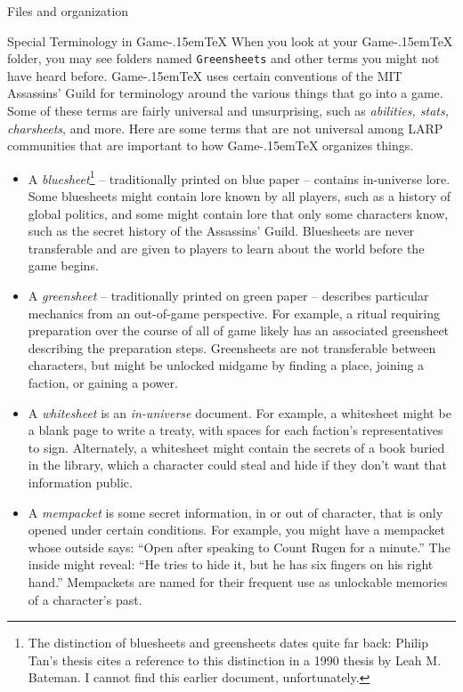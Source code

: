 \documentclass[11pt]{article}
\def\gametex{\mbox{Game\kern-.15em\TeX}}
\begin{document}
\begin{section}{Files and organization}
\begin{subsection}{Special Terminology in \gametex{}}
When you look at your \gametex{} folder, you may see folders named \texttt{Greensheets} and other terms you might not have heard before.  \gametex{} uses certain conventions of the MIT Assassins' Guild for terminology around the various things that go into a game.  Some of these terms are fairly universal and unsurprising, such as \textit{abilities, stats, charsheets}, and more.  Here are some terms that are not universal among LARP communities that are important to how \gametex{} organizes things.
\begin{itemize}
    \item A \textit{bluesheet}\footnote{The distinction of bluesheets and greensheets dates quite far back: Philip Tan's thesis cites a reference to this distinction in a 1990 thesis by Leah M. Bateman.  I cannot find this earlier document, unfortunately.} -- traditionally printed on blue paper -- contains in-universe lore.  Some bluesheets might contain lore known by all players, such as a history of global politics, and some might contain lore that only some characters know, such as the secret history of the Assassins' Guild.  Bluesheets are never transferable and are given to players to learn about the world before the game begins.
    \item A \textit{greensheet} -- traditionally printed on green paper -- describes particular mechanics from an out-of-game perspective.  For example, a ritual requiring preparation over the course of all of game likely has an associated greensheet describing the preparation steps.  Greensheets are not transferable between characters, but might be unlocked midgame by finding a place, joining a faction, or gaining a power.
    \item A \textit{whitesheet} is an \emph{in-universe} document.  For example, a whitesheet might be a blank page to write a treaty, with spaces for each faction's representatives to sign.  Alternately, a whitesheet might contain the secrets of a book buried in the library, which a character could steal and hide if they don't want that information public.
    \item A \textit{mempacket} is some secret information, in or out of character, that is only opened under certain conditions.  For example, you might have a mempacket whose outside says: ``Open after speaking to Count Rugen for a minute.'' The inside might reveal: ``He tries to hide it, but he has six fingers on his right hand.''  Mempackets are named for their frequent use as unlockable memories of a character's past.

\end{itemize}
\end{subsection}
\end{section}
\end{document}
